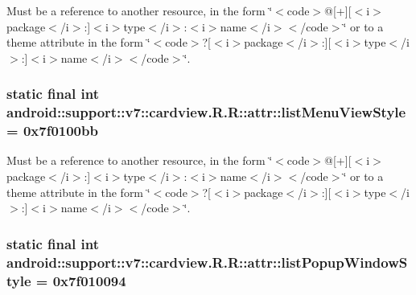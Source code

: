 Must be a reference to another resource, in the form \char`\"{}$<$code$>$@\mbox{[}+\mbox{]}\mbox{[}$<$i$>$package$<$/i$>$:\mbox{]}$<$i$>$type$<$/i$>$:$<$i$>$name$<$/i$>$$<$/code$>$\char`\"{} or to a theme attribute in the form \char`\"{}$<$code$>$?\mbox{[}$<$i$>$package$<$/i$>$:\mbox{]}\mbox{[}$<$i$>$type$<$/i$>$:\mbox{]}$<$i$>$name$<$/i$>$$<$/code$>$\char`\"{}. \hypertarget{classandroid_1_1support_1_1v7_1_1cardview_1_1_r_1_1attr_c5c0edc8f6b4033d7888076cdeaa7e14}{
\subsubsection[{listMenuViewStyle}]{\setlength{\rightskip}{0pt plus 5cm}static final int android::support::v7::cardview.R.R::attr::listMenuViewStyle = 0x7f0100bb}}
\label{classandroid_1_1support_1_1v7_1_1cardview_1_1_r_1_1attr_c5c0edc8f6b4033d7888076cdeaa7e14}


Must be a reference to another resource, in the form \char`\"{}$<$code$>$@\mbox{[}+\mbox{]}\mbox{[}$<$i$>$package$<$/i$>$:\mbox{]}$<$i$>$type$<$/i$>$:$<$i$>$name$<$/i$>$$<$/code$>$\char`\"{} or to a theme attribute in the form \char`\"{}$<$code$>$?\mbox{[}$<$i$>$package$<$/i$>$:\mbox{]}\mbox{[}$<$i$>$type$<$/i$>$:\mbox{]}$<$i$>$name$<$/i$>$$<$/code$>$\char`\"{}. \hypertarget{classandroid_1_1support_1_1v7_1_1cardview_1_1_r_1_1attr_1a63c2adc4813525b0de545a8c07bd85}{
\subsubsection[{listPopupWindowStyle}]{\setlength{\rightskip}{0pt plus 5cm}static final int android::support::v7::cardview.R.R::attr::listPopupWindowStyle = 0x7f010094}}
\label{classandroid_1_1support_1_1v7_1_1cardview_1_1_r_1_1attr_1a63c2adc4813525b0de545a8c07bd85}


